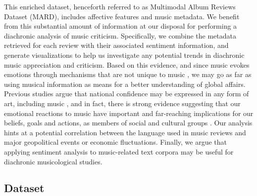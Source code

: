 This enriched dataset, henceforth referred to as Multimodal Album Reviews Dataset (MARD), includes affective features and music metadata. %
We benefit from this substantial amount of information at our disposal for performing a diachronic analysis of music criticism. Specifically, we combine the metadata retrieved for each review with their associated sentiment information, and generate visualizations to help us investigate any potential trends in diachronic music appreciation and criticism. Based on this evidence, and since music evokes emotions through mechanisms that are not unique to music \citep{Juslin2008}, we may go as far as using musical information as means for a better understanding of global affairs. Previous studies argue that national confidence may be expressed in any form of art, including music \citep{Moisi2010}, and in fact, there is strong evidence suggesting that our emotional reactions to music have important and far-reaching implications for our beliefs, goals and actions, as members of social and cultural groups \citep{Alcorta2008}. Our analysis hints at a potential correlation between the language used in music reviews and major geopolitical events or economic fluctuations. Finally, we argue that applying sentiment analysis to music-related text corpora may be useful for diachronic musicological studies.


\subsection{Dataset}
\label{sec:musicology:mard}

